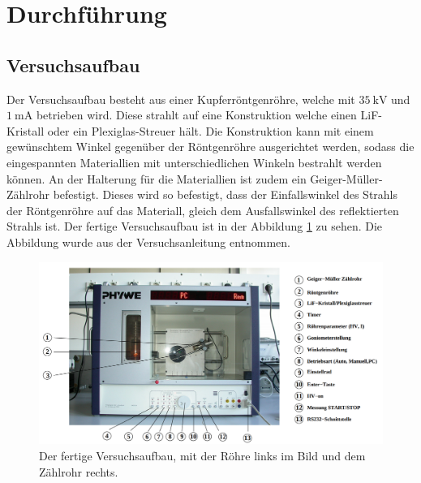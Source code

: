 \section{Durchführung}
\label{sec:Durchführung}
\subsection{Versuchsaufbau}
Der Versuchsaufbau besteht aus einer Kupferröntgenröhre, welche mit $\SI{35}{\kilo\volt}$ und $\SI{1}{\milli\ampere}$ betrieben wird.
Diese strahlt auf eine Konstruktion welche einen LiF-Kristall oder ein Plexiglas-Streuer hält.
Die Konstruktion kann mit einem gewünschtem Winkel gegenüber der Röntgenröhre ausgerichtet werden, sodass die eingespannten Materiallien mit unterschiedlichen Winkeln bestrahlt werden können.
An der Halterung für die Materiallien ist zudem ein Geiger-Müller-Zählrohr befestigt.
Dieses wird so befestigt, dass der Einfallswinkel des Strahls der Röntgenröhre auf das Materiall, gleich dem Ausfallswinkel des reflektierten Strahls ist.
Der fertige Versuchsaufbau ist in der Abbildung \ref{fig:aufbau} zu sehen.
Die Abbildung wurde aus der Versuchsanleitung \cite{anleitung} entnommen.

\begin{figure}
    \centering
    \includegraphics[width=\textwidth]{content/data/Roehre.png}
    \caption{Der fertige Versuchsaufbau, mit der Röhre links im Bild und dem Zählrohr rechts.}
    \label{fig:aufbau}
\end{figure}

